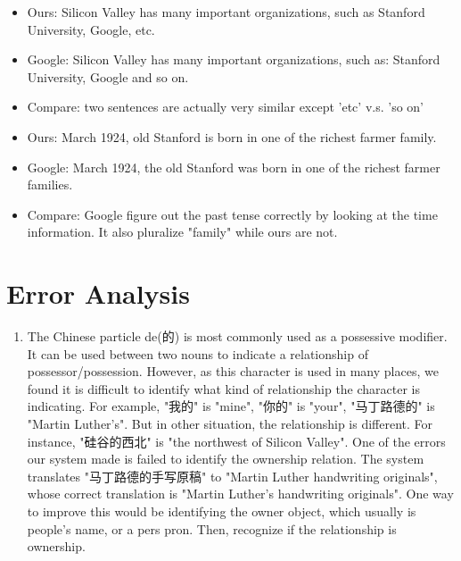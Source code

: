 \documentclass[11pt]{article} %
\begin{document}
\begin{CJK}{UTF8}{gbsn}
\begin{itemize}
\end{itemize}
\begin{itemize}
\item Ours: Silicon Valley has many important organizations, such as Stanford University, Google, etc.
\item Google: Silicon Valley has many important organizations, such as: Stanford University, Google and so on.
\item Compare: two sentences are actually very similar except 'etc' v.s. 'so on'
\end{itemize}
\begin{itemize}
\item Ours: March 1924, old Stanford is born in one of the richest farmer family.
\item Google: March 1924, the old Stanford was born in one of the richest farmer families.
\item Compare: Google figure out the past tense correctly by looking at the time information. It also pluralize "family" while ours are not.
\end{itemize}

\section{Error Analysis}
\begin{enumerate}
\item The Chinese particle de(的) is most commonly used as a possessive modifier. It can be used between two nouns to indicate a relationship of possessor/possession. However, as this character is used in many places, we found it is difficult to identify what kind of relationship the character is indicating. For example, "我的" is "mine", "你的" is "your", "马丁路德的" is "Martin Luther's". But in other situation, the relationship is different. For instance, "硅谷的西北" is "the northwest of Silicon Valley". One of the errors our system made is failed to identify the ownership relation. The system translates "马丁路德的手写原稿" to "Martin Luther handwriting originals", whose correct translation is "Martin Luther's handwriting originals". One way to improve this would be identifying the owner object, which usually is people's name, or a pers pron. Then, recognize if the relationship is ownership.


\end{enumerate}
\end{CJK}
\end{document}
